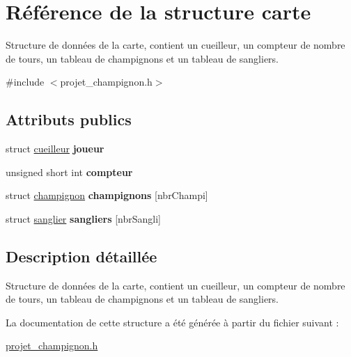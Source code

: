 \hypertarget{structcarte}{}\section{Référence de la structure carte}
\label{structcarte}


Structure de données de la carte, contient un cueilleur, un compteur de nombre de tours, un tableau de champignons et un tableau de sangliers.  




{\ttfamily \#include $<$projet\+\_\+champignon.\+h$>$}

\subsection*{Attributs publics}
\begin{DoxyCompactItemize}
\item 
\hypertarget{structcarte_ac3e1886de48dd33100916e10bd12c3c8}{}\label{structcarte_ac3e1886de48dd33100916e10bd12c3c8} 
struct \hyperlink{structcueilleur}{cueilleur} {\bfseries joueur}
\item 
\hypertarget{structcarte_a4adff2f0660306ec064a89ec15c8f5e3}{}\label{structcarte_a4adff2f0660306ec064a89ec15c8f5e3} 
unsigned short int {\bfseries compteur}
\item 
\hypertarget{structcarte_acf926052ad7df130d9eb138fae9cb24d}{}\label{structcarte_acf926052ad7df130d9eb138fae9cb24d} 
struct \hyperlink{structchampignon}{champignon} {\bfseries champignons} \mbox{[}nbr\+Champi\mbox{]}
\item 
\hypertarget{structcarte_ad5a3d370bf5536fae41fdbc7275d5cbd}{}\label{structcarte_ad5a3d370bf5536fae41fdbc7275d5cbd} 
struct \hyperlink{structsanglier}{sanglier} {\bfseries sangliers} \mbox{[}nbr\+Sangli\mbox{]}
\end{DoxyCompactItemize}


\subsection{Description détaillée}
Structure de données de la carte, contient un cueilleur, un compteur de nombre de tours, un tableau de champignons et un tableau de sangliers. 

La documentation de cette structure a été générée à partir du fichier suivant \+:\begin{DoxyCompactItemize}
\item 
\hyperlink{projet__champignon_8h}{projet\+\_\+champignon.\+h}\end{DoxyCompactItemize}
